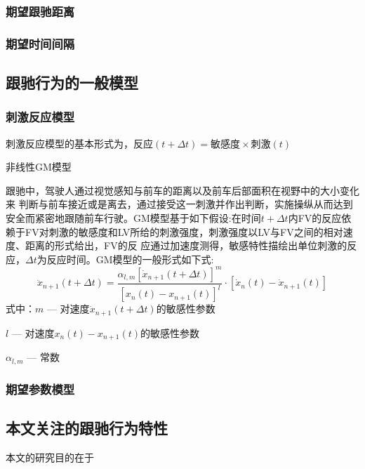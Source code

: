 \subsubsection{期望跟驰距离}

\subsubsection{期望时间间隔}



\subsection{跟驰行为的一般模型}
\subsubsection{刺激反应模型}
刺激反应模型的基本形式为，$\text{反应}(t+\Delta t)=\text{敏感度}{\times}\text{刺激}(t)$

非线性GM模型 

跟驰中，驾驶人通过视觉感知与前车的距离以及前车后部面积在视野中的大小变化来
判断与前车接近或是离去，通过接受这一刺激并作出判断，实施操纵从而达到安全而紧密地跟随前车行驶。GM模型基于如下假设:在时间$t+\Delta t$内FV的反应依赖于FV对刺激的敏感度和LV所给的刺激强度，刺激强度以LV与FV之间的相对速度、距离的形式给出，FV的反
应通过加速度测得，敏感特性描绘出单位刺激的反应，$\Delta t$为反应时间。GM模型的一般形式如下式:
\begin{equation}
\ddot{x}_{n+1}(t+\Delta t)=\frac{\alpha_{l,m}[\dot{x}_{n+1}(t+\Delta t)]^m}{[x_n(t)-x_{n+1}(t)]^l}\cdot [\dot{x}_n(t)-\dot{x}_{n+1}(t)]
\end{equation}
式中：$m$ --- 对速度$\dot{x}_{n+1}(t+\Delta t)$的敏感性参数

$l$ --- 对速度$x_n(t)-x_{n+1}(t)$的敏感性参数

$\alpha_{l,m}$ --- 常数

\subsubsection{期望参数模型}

\subsection{本文关注的跟驰行为特性}
本文的研究目的在于
